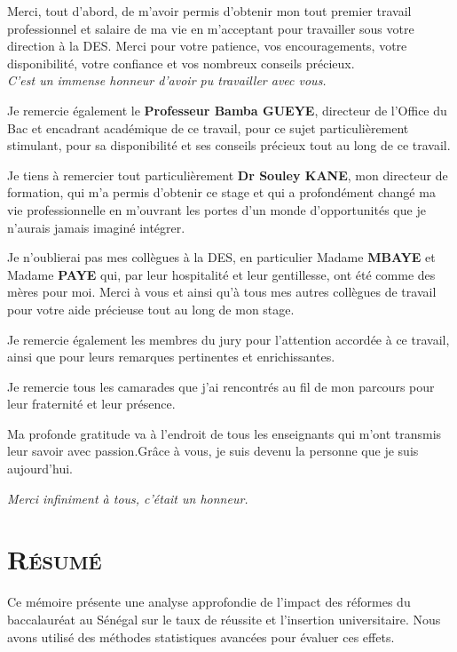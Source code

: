 \documentclass[a4paper,12pt]{report}                %
\begin{document}
    Merci, tout d’abord, de m’avoir permis d’obtenir mon tout premier travail professionnel et salaire de ma vie en m’acceptant pour travailler sous votre direction à la DES. Merci pour votre patience, vos encouragements, 
    votre disponibilité, votre confiance et vos nombreux conseils précieux.\\
    \textit{ C’est un immense honneur d’avoir pu travailler avec vous.}

    Je remercie également le \textbf{Professeur Bamba GUEYE}, directeur de l’Office du Bac et encadrant académique de ce travail, pour ce sujet particulièrement stimulant, pour sa disponibilité et ses conseils précieux tout au long de ce travail.

    Je tiens à remercier tout particulièrement \textbf{Dr Souley KANE}, mon directeur de formation, qui m’a permis d’obtenir ce stage et qui a profondément changé ma vie professionnelle en m’ouvrant les portes d’un monde d’opportunités que je n’aurais jamais imaginé intégrer.

    Je n’oublierai pas mes collègues à la DES, en particulier Madame \textbf{MBAYE} et Madame \textbf{PAYE} qui, par leur hospitalité et leur gentillesse, ont été comme des mères pour moi.
    Merci à vous et ainsi qu’à tous mes autres collègues de travail pour votre aide précieuse tout au long de mon stage.

    Je remercie également les membres du jury pour l’attention accordée à ce travail, ainsi que pour leurs remarques pertinentes et enrichissantes.

    Je remercie tous les camarades que j’ai rencontrés au fil de mon parcours pour leur fraternité et leur présence.

    Ma profonde gratitude va à l’endroit de tous les enseignants qui m’ont transmis leur savoir avec passion.Grâce à vous, je suis devenu la personne que je suis aujourd’hui.
    
    \vspace{0.5cm}
    \hfill \textit{Merci infiniment à tous, c'était un honneur.}

    \newpage
    \section*{\textsc{Résumé}}
    Ce mémoire présente une analyse approfondie de l'impact des réformes du baccalauréat au Sénégal sur le taux de réussite et l'insertion universitaire. Nous avons utilisé des méthodes statistiques avancées pour évaluer ces effets.
    
\end{document}
